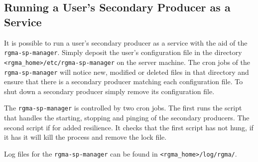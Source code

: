 \subsection{Running a User's Secondary Producer as a Service}
\label{sec:spManager}
It is possible to run a user's secondary producer as a service with
the aid of the \texttt{rgma-sp-manager}. Simply deposit the user's
configuration file in the directory
\verb!<rgma_home>!\texttt{/etc/rgma-sp-manager} on the server
machine. The cron jobs of the \texttt{rgma-sp-manager} will notice
new, modified or deleted files in that directory and ensure that there
is a secondary producer matching each configuration file. To shut down
a secondary producer simply remove its configuration file.

The \texttt{rgma-sp-manager} is controlled by two cron jobs. The
first runs the script that handles the starting, stopping and pinging
of the secondary producers. The second script if for added
resilience. It checks that the first script has not hung, if it has it
will kill the process and remove the lock file.

Log files for the \texttt{rgma-sp-manager} can be found in
\verb!<rgma_home>!\texttt{/log/rgma/}.
